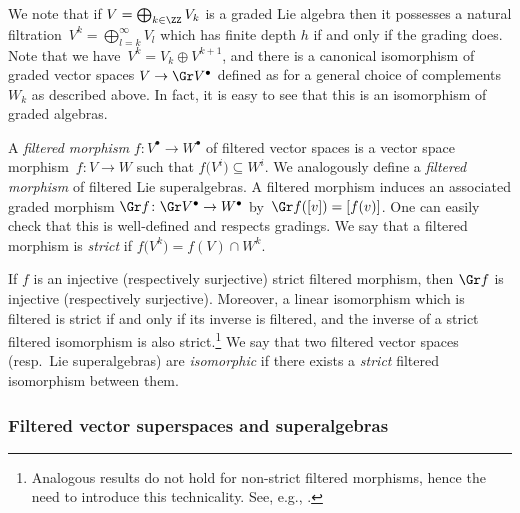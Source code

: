 We note that if $V=\bigoplus_{k\in\ZZ}V_k$ is a graded Lie algebra then it possesses a natural filtration~${V^k=\bigoplus_{l=k}^\infty V_l}$ which has finite depth $h$ if and only if the grading does. Note that we have~${V^k=V_k\oplus V^{k+1}}$, and there is a canonical isomorphism of graded vector spaces $V\to\Gr V^\bullet$ defined as for a general choice of complements $W_k$ as described above. In fact, it is easy to see that this is an isomorphism of graded algebras.

A \emph{filtered morphism} $f\colon V^\bullet\to W^\bullet$ of filtered vector spaces is a vector space morphism~$f\colon V\to W$ such that $f\bigl(V^i\bigr)\subseteq W^i$. We analogously define a \emph{filtered morphism} of filtered Lie superalgebras. A filtered morphism induces an associated graded morphism $\Gr f\colon \Gr V^\bullet \to W^\bullet$ by~${\Gr f([v])=[f(v)]}$. One can easily check that this is well-defined and respects gradings. We say that a filtered morphism is \emph{strict} if $f\bigl(V^k\bigr)=f(V)\cap W^k$.

If $f$ is an injective (respectively surjective) strict filtered morphism, then $\Gr f$ is injective (respectively surjective). Moreover, a linear isomorphism which is filtered is strict if and only if its inverse is filtered, and the inverse of a strict filtered isomorphism is also strict.\footnote{Analogous results do not hold for non-strict filtered morphisms, hence the need to introduce this technicality. See, e.g., \cite[\href{https://stacks.math.columbia.edu/tag/0108}{Example 0108}]{stacks-project}.}
We say that two filtered vector spaces (resp.\ Lie superalgebras) are \emph{isomorphic} if there exists a \emph{strict} filtered isomorphism between them.

\subsubsection{Filtered vector superspaces and superalgebras}
\label{sec:filtered-superspace-superalg}

